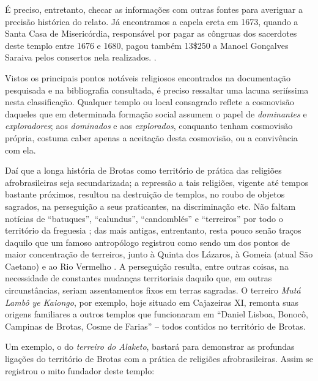 É preciso, entretanto, checar as informações com outras fontes para averiguar a precisão histórica do relato. Já encontramos a capela ereta em 1673, quando a Santa Casa de Misericórdia, responsável por pagar as côngruas dos sacerdotes deste templo entre 1676 e 1680, pagou também 13\$250 a Manoel Gonçalves Saraiva pelos consertos nela realizados. \cite[p.~11]{ott_engenhos_1996}. 

Vistos os principais pontos notáveis religiosos encontrados na documentação pesquisada e na bibliografia consultada, é preciso ressaltar uma lacuna seriíssima nesta classificação. Qualquer templo ou local consagrado reflete a cosmovisão daqueles que em determinada formação social assumem o papel de \textit{dominantes} e \textit{exploradores}; aos \textit{dominados} e aos \textit{explorados}, conquanto tenham cosmovisão própria, costuma caber apenas a aceitação desta cosmovisão, ou a convivência com ela. 

Daí que a longa história de Brotas como território de prática das religiões afrobrasileiras seja secundarizada; a repressão a tais religiões, vigente até tempos bastante próximos, resultou na destruição de templos, no roubo de objetos sagrados, na perseguição a seus praticantes, na discriminação etc. Não faltam notícias de ``batuques'', ``calundus'', ``candomblés'' e ``terreiros'' por todo o território da freguesia \cite{carneiro_candomble_1954,reis_domingos_2008,REISSILVA1989}; das mais antigas, entrentanto, resta pouco senão traços daquilo que um famoso antropólogo registrou como sendo um dos pontos de maior concentração de terreiros, junto à Quinta dos Lázaros, à Gomeia (atual São Caetano) e ao Rio Vermelho \cite{bastide_mystique_1978}. A perseguição resulta, entre outras coisas, na necessidade de constantes mudanças territoriais daquilo que, em outras circunstâncias, seriam assentamentos fixos em terras sagradas. O terreiro \textit{Mutá Lambô ye Kaiongo}, por exemplo, hoje situado em Cajazeiras XI, remonta suas origens familiares a outros templos que funcionaram em ``Daniel Lisboa, Bonocô, Campinas de Brotas, Cosme de Farias'' \cite[p.~50]{alves_paquetan_2010} -- todos contidos no território de Brotas.

Um exemplo, o do \textit{terreiro do Alaketo}, bastará para demonstrar as profundas ligações do território de Brotas com a prática de religiões afrobrasileiras. Assim se registrou o mito fundador deste templo:

